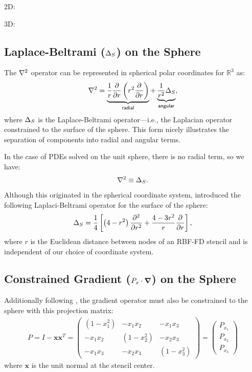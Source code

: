 \documentclass{report}
\begin{document}
{2D: 

3D: 

\subsection{Laplace-Beltrami ($\LaplaceBeltrami$) on the Sphere}

The $\Laplacian$ operator can be represented in spherical polar coordinates for $\mathbb{R}^3$ as: 
\begin{align} 
\nabla^2 = \underbrace{\frac{1}{r} \frac{\partial }{\partial r} \left( r^{2} \frac{\partial }{\partial r}  \right)}_{\mathsf{radial}} + \underbrace{\frac{1}{r^2} \Delta_{S}}_{\mathsf{angular}} , \label{eq:laplacian_in_spherical}
\end{align}
where $\LaplaceBeltrami$ is the Laplace-Beltrami operator---i.e., the Laplacian operator constrained to the surface of the sphere. This form nicely illustrates the separation of components into radial and angular terms. 

In the case of PDEs solved on the unit sphere, there is no radial term, so we have:
\begin{align}
\nabla^2 \equiv \Delta_S .
\end{align}
Although this originated in the spherical coordinate system, \cite{WrightFlyerYuen10} introduced the following Laplaci-Beltrami operator for the surface of the sphere: 
\begin{align} 
\Delta_S = \frac{1}{4} \left[ \left(4-r^2\right) \frac{\partial^2 }{\partial r^2} + \frac{4-3r^2}{r} \frac{\partial }{\partial r} \right],
\end{align} 
where $r$ is the Euclidean distance between nodes of an RBF-FD stencil and is independent of our choice of coordinate system. 

\subsection{Constrained Gradient ($P_{x} \cdot \grad$) on the Sphere}

Additionally following \cite{FlyerWright09, FlyerLehto11}, the gradient operator must also be constrained to the sphere with this projection matrix: 
\begin{align}
P = I - \mathbf{x} \mathbf{x}^T =  \begin{pmatrix} 
(1-x_1^2) & -x_1 x_2 & -x_1 x_3 \\
-x_1 x_2 & (1-x_2^2) & -x_2 x_3 \\ 
-x_1 x_3 & -x_2 x_3 & (1-x_3^2) 
\end{pmatrix} = \begin{pmatrix} P_{x_1} \\ P_{x_2} \\ P_{x_3} \end{pmatrix}
\label{eq:project_gradient}
\end{align}
where $\mathbf{x}$ is the unit normal at the stencil center. 


}
\end{document}
